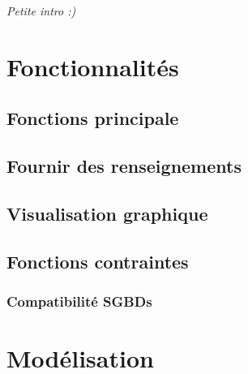 \textit{Petite intro :)}

\section{Fonctionnalités}
\subsection{Fonctions principale}
\subsection{Fournir des renseignements}
\subsection{Visualisation graphique}
	
\subsection{Fonctions contraintes}
\subsubsection{Compatibilité SGBDs}

\section{Modélisation}